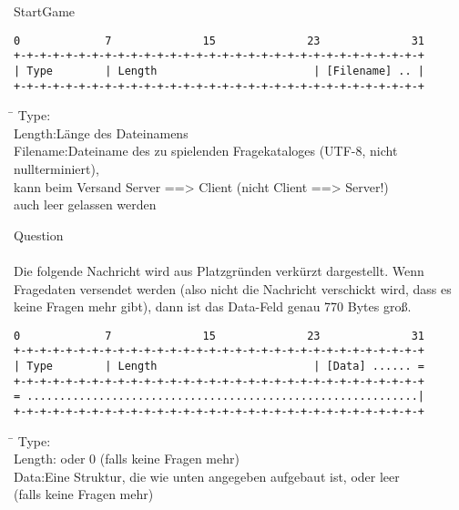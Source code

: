 \documentclass[a4paper,10pt]{article}
\begin{document}
$~~$\\StartGame
\begin{Verbatim}[fontfamily=courier]
 0             7              15              23              31
+-+-+-+-+-+-+-+-+-+-+-+-+-+-+-+-+-+-+-+-+-+-+-+-+-+-+-+-+-+-+-+
| Type        | Length                        | [Filename] .. |
+-+-+-+-+-+-+-+-+-+-+-+-+-+-+-+-+-+-+-+-+-+-+-+-+-+-+-+-+-+-+-+
\end{Verbatim}

\begin{tabbing}
\hspace{2 cm}\=\kill
Type:\\
Length:\>Länge des Dateinamens\\
Filename:\>Dateiname des zu spielenden Fragekataloges (UTF-8, nicht nullterminiert), \\
\>kann beim Versand Server ==> Client (nicht Client ==> Server!) \\
\>auch leer gelassen werden
\end{tabbing}

\newpage

$~~$\\Question\\\\
Die folgende Nachricht wird aus Platzgründen verkürzt dargestellt. Wenn
Fragedaten versendet werden (also nicht die Nachricht verschickt wird, dass es
keine Fragen mehr gibt), dann ist das Data-Feld genau 770 Bytes groß.

\begin{Verbatim}[fontfamily=courier]
 0             7              15              23              31
+-+-+-+-+-+-+-+-+-+-+-+-+-+-+-+-+-+-+-+-+-+-+-+-+-+-+-+-+-+-+-+
| Type        | Length                        | [Data] ...... =
+-+-+-+-+-+-+-+-+-+-+-+-+-+-+-+-+-+-+-+-+-+-+-+-+-+-+-+-+-+-+-+
= ............................................................|
+-+-+-+-+-+-+-+-+-+-+-+-+-+-+-+-+-+-+-+-+-+-+-+-+-+-+-+-+-+-+-+
\end{Verbatim}

\begin{tabbing}
\hspace{2 cm}\=\kill
Type:\\
Length: oder 0 (falls keine Fragen mehr)\\
Data:\>Eine Struktur, die wie unten angegeben aufgebaut ist, oder leer\\
\> (falls keine Fragen mehr)
\end{tabbing}
\end{document}
